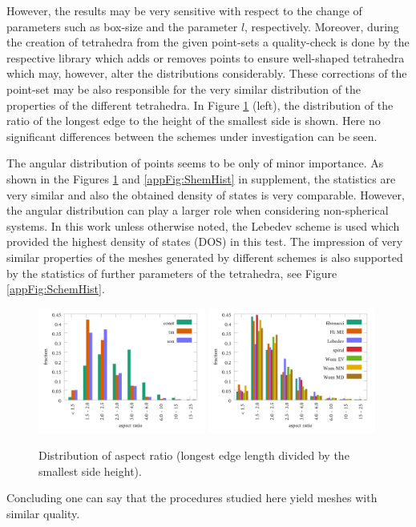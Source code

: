 However, the results may be very sensitive with respect to the change of parameters such as box-size and the parameter $l$, respectively.
Moreover, during the creation of tetrahedra from the given point-sets a quality-check is done by the respective library \cite{tetgen} which adds or removes points to ensure well-shaped tetrahedra which may, however, alter the distributions considerably.
These corrections of the point-set may be also responsible for the very similar distribution of the properties of the different tetrahedra.
In Figure \ref{fig:SchemHist} (left), the distribution of the ratio of the longest edge to the height of the smallest side is shown.
Here no significant differences between the schemes under investigation can be seen.

The angular distribution of points seems to be only of minor importance.
As shown in the Figures \ref{fig:SchemHist} and \ref{appFig:ShemHist} in supplement, the statistics are very similar and also the obtained density of states is very comparable.
However, the angular distribution can play a larger role when considering non-spherical systems.
In this work unless otherwise noted, the Lebedev scheme is used which provided the highest density of states (DOS) in this test.
The impression of very similar properties of the meshes generated by different schemes is also supported by the statistics of further parameters of the tetrahedra, see Figure \ref{appFig:SchemHist}.
\begin{figure}
\includegraphics[width=0.49\textwidth]{Figures/Radi_hist.pdf}
\includegraphics[width=0.49\textwidth]{Figures/Sph_hist.pdf}
\caption{Distribution of aspect ratio (longest edge length divided by the smallest side height).}
\label{fig:SchemHist}
\end{figure}
Concluding one can say that the procedures studied here yield meshes with similar quality.

